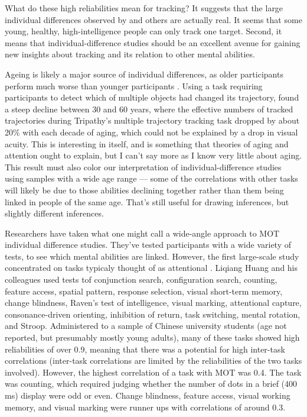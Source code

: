 \documentclass[
]{book}
\begin{document}
What do these high reliabilities mean for tracking? It suggests that the large individual differences observed by \citet{oksamaMultipleObjectTracking2004} and others are actually real. It seems that some young, healthy, high-intelligence people can only track one target. Second, it means that individual-difference studies should be an excellent avenue for gaining new insights about tracking and its relation to other mental abilities.

Ageing is likely a major source of individual differences, as older participants perform much worse than younger participants \citep{trickAgerelatedDifferencesMultipleobject2005, sekulerAgerelatedChangesAttentional2008, roudaiaDifferentEffectsAging2017}. Using a task requiring participants to detect which of multiple objects had changed its trajectory, \citet{kennedyEarlyAgerelatedDecline2009} found a steep decline between 30 and 60 years, where the effective numbers of tracked trajectories during Tripathy's multiple trajectory tracking task dropped by about 20\% with each decade of aging, which could not be explained by a drop in visual acuity. This is interesting in itself, and is something that theories of aging and attention ought to explain, but I can't say more as I know very little about aging. This result must also color our interpretation of individual-difference studies using samples with a wide age range --- some of the correlations with other tasks will likely be due to those abilities declining together rather than them being linked in people of the same age. That's still useful for drawing inferences, but slightly different inferences.

Researchers have taken what one might call a wide-angle approach to MOT individual difference studies. They've tested participants with a wide variety of tests, to see which mental abilities are linked. However, the first large-scale study concentrated on tasks typicaly thought of as attentional \citep{huangMeasuringInterrelationsMultiple2012}. Liqiang Huang and his colleagues used tests tof conjunction search, configuration search, counting, feature access, spatial pattern, response selection, visual short-term memory, change blindness, Raven's test of intelligence, visual marking, attentional capture, consonance-driven orienting, inhibition of return, task switching, mental rotation, and Stroop. Administered to a sample of Chinese university students (age not reported, but presumably mostly young adults), many of these tasks showed high reliabilities of over 0.9, meaning that there was a potential for high inter-task correlations (inter-task correlations are limited by the reliabilities of the two tasks involved). However, the highest correlation of a task with MOT was 0.4. The task was counting, which required judging whether the number of dots in a brief (400 ms) display were odd or even. Change blindness, feature access, visual working memory, and visual marking were runner ups with correlations of around 0.3.
\end{document}
